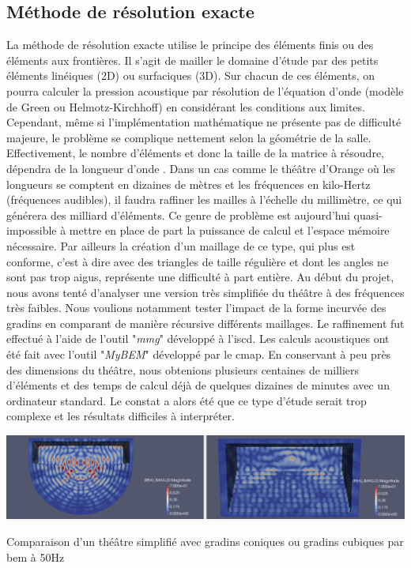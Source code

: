  
	\subsection{Méthode de résolution exacte} \label{sect_resExacte}

La méthode de résolution exacte utilise le principe des éléments finis ou des éléments aux frontières. Il s'agit de mailler le domaine d'étude par des petits éléments linéiques (2D) ou surfaciques (3D). Sur chacun de ces éléments, on pourra calculer la pression acoustique par résolution de l'équation d'onde (modèle de Green ou Helmotz-Kirchhoff) en considérant les conditions aux limites. Cependant, même si l'implémentation mathématique ne présente pas de difficulté majeure, le problème se complique nettement selon la géométrie de la salle. Effectivement, le nombre d'éléments et donc la taille de la matrice à résoudre, dépendra de la longueur d'onde \cite[p. 740]{beamtracing}. Dans un cas comme le théâtre d'Orange où les longueurs se comptent en dizaines de mètres et les fréquences en kilo-Hertz (fréquences audibles), il faudra raffiner les mailles à l'échelle du millimètre, ce qui générera des milliard d'éléments. Ce genre de problème est aujourd'hui quasi-impossible à mettre en place de part la puissance de calcul et l'espace mémoire nécessaire. Par ailleurs la création d'un maillage de ce type, qui plus est conforme, c'est à dire avec des triangles de taille régulière et dont les angles ne sont pas trop aigus, représente une difficulté à part entière.
Au début du projet, nous avons tenté d'analyser une version très simplifiée du théâtre à des fréquences très faibles. Nous voulions notamment tester l'impact de la forme incurvée des gradins en comparant de manière récursive différents maillages. Le raffinement fut effectué à l'aide de l'outil "\textit{mmg}" développé à l'\gls{iscd}. Les calculs acoustiques ont été fait avec l'outil "\textit{MyBEM}" développé par le \gls{cmap}. En conservant à peu près des dimensions du théâtre, nous obtenions plusieurs centaines de milliers d'éléments et des temps de calcul déjà de quelques dizaines de minutes avec un ordinateur standard. Le constat a alors été que ce type d'étude serait trop complexe et les résultats difficiles à interpréter.

\begin{figureth}
	\includegraphics[width=\linewidth]{images/BEM}
	\caption{Comparaison d'un théâtre simplifié avec gradins coniques ou gradins cubiques par \gls{bem} à 50Hz}
	\label{BEM}
\end{figureth}

